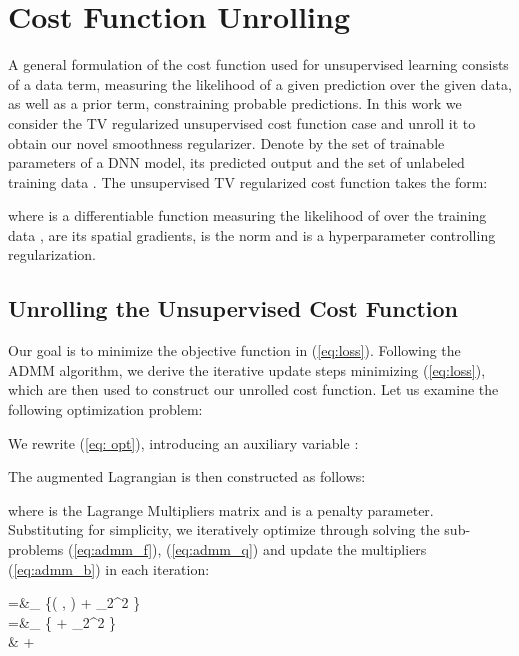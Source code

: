 \documentclass[10pt,twocolumn,letterpaper]{article}
\begin{document}
  \section{Cost Function Unrolling}
A general formulation of the cost function used for unsupervised learning consists of a data term, measuring the likelihood of a given prediction over the given data, as well as a prior term, constraining probable predictions. In this work we consider the TV regularized unsupervised cost function case and unroll it to obtain our novel smoothness regularizer. Denote by  the set of trainable parameters of a DNN model, its predicted output  and the set of unlabeled training data . The unsupervised TV regularized cost function takes the form:

where  is a differentiable function measuring the likelihood of  over the training data ,  are its spatial gradients,  is the  norm and  is a hyperparameter controlling regularization.

\subsection{Unrolling the Unsupervised Cost Function}
Our goal is to minimize the objective function in (\ref{eq:loss}). Following the ADMM \cite{admm0} algorithm, we derive the iterative update steps minimizing (\ref{eq:loss}), which are then used to construct our unrolled cost function.
Let us examine the following optimization problem:

We rewrite (\ref{eq: opt}), introducing an auxiliary variable :

The augmented Lagrangian is then constructed as follows:

where  is the Lagrange Multipliers matrix and  is a penalty parameter. Substituting  for simplicity, we iteratively optimize  through solving the sub-problems (\ref{eq:admm_f}), (\ref{eq:admm_q}) and update the multipliers (\ref{eq:admm_b}) in each iteration:

    =&\min_{} \left\{\mathbf{\Phi}\left( , \right) +  _2^2 \right\} \label{eq:admm_f} \\ 
    =&\min_{} \left\{ +  _2^2 \right\} \label{eq:admm_q} \\ 
    \boldsymbol{\beta} \leftarrow &\boldsymbol{\beta} + \eta {} \label{eq:admm_b}
\end{document}

